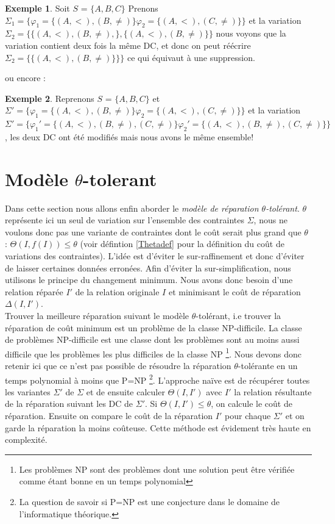 \documentclass[letterpaper, 12pt]{report}
\theoremstyle{definition}
\newtheorem{myexample}{Exemple}
\begin{document}
\begin{myexample}
Soit $S$ = $\{A,B,C\}$
Prenons $\Sigma_1 = \{ \varphi_1= \{(A,<),(B,\neq) \} \varphi_2= \{(A,<),(C,\neq) \}\}$ et la variation $ \Sigma_2 = \{ \{(A,<),(B,\neq), \} ,\{(A,<),(B,\neq) \}\}$
nous voyons que la variation contient deux fois la même DC, et donc on peut réécrire $ \Sigma_2 = \{ \{(A,<),(B,\neq) \}\}\}$ ce qui équivaut à une suppression.

\end{myexample}

ou encore :

\begin{myexample}

Reprenons $S$ = $\{A,B,C\}$
et $\Sigma' = \{ \varphi_1= \{(A,<),(B,\neq) \} \varphi_2= \{(A,<),(C,\neq) \}\}$ et la variation $\Sigma' = \{ \varphi_1'= \{(A,<),(B,\neq),(C,\neq) \} \varphi_2'= \{(A,<),(B,\neq),(C,\neq) \}\}$ , les deux DC ont été modifiés mais nous avons le même ensemble!
\end{myexample}
\section{Modèle $\theta$-tolerant}

Dans cette section nous allons enfin aborder le \emph{modèle de réparation $\theta$-tolérant}. $\theta$ représente ici un seul de variation sur l'ensemble des contraintes $\Sigma$, nous ne voulons donc pas une variante de contraintes dont le coût serait plus grand que $\theta$ : $\Theta(I,f(I)) \leq \theta$ (voir défintion \ref{Thetadef} pour la définition du coût de variations des contraintes). L'idée est d'éviter le sur-raffinement et donc d'éviter de laisser certaines données erronées. Afin d'éviter la sur-simplification, nous utilisons le principe du changement minimum. Nous avons donc besoin d'une relation réparée $I'$ de la relation originale $I$ et minimisant le coût de réparation $\Delta(I,I')$.\\

Trouver la meilleure réparation suivant le modèle $\theta$-tolérant, i.e trouver la réparation de coût minimum est un problème de la classe NP-difficile. La classe de problèmes NP-difficile est une classe dont les problèmes sont au moins aussi difficile que les problèmes les plus difficiles de la classe NP \footnote{Les problèmes NP sont des problèmes dont une solution peut être vérifiée comme étant bonne en un temps polynomial}. Nous devons donc retenir ici que ce n'est pas possible de résoudre la réparation $\theta$-tolérante en un temps polynomial à moins que P=NP \footnote{La question de savoir si P=NP est une conjecture dans le domaine de l'informatique théorique.}. L'approche naïve est de récupérer toutes les variantes $\Sigma'$ de $\Sigma$ et de ensuite calculer $\Theta(I,I')$  avec $I'$ la relation résultante de la réparation suivant les DC de $\Sigma'$. Si $\Theta(I,I') \leq \theta$, on calcule le coût de réparation. Ensuite on compare le coût de la réparation $I'$ pour chaque $\Sigma'$ et on garde la réparation la moins coûteuse. Cette méthode est évidement très haute en complexité.\\
\end{document}
